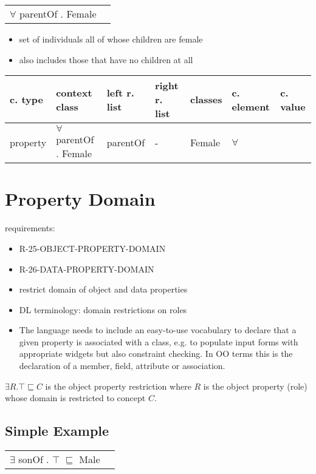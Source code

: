 \documentclass{llncs}
\newenvironment{gcotable}{
  \scriptsize
  \sffamily
  \vspace{0.3cm}
	\begin{center}
  \begin{tabular}{l|l|l|l|l|l|l}
  \hline
  \textbf{c. type} & \textbf{context class} & \textbf{left r. list} & \textbf{right r. list} & \textbf{classes} & \textbf{c. element} & \textbf{c. value} \\
  \hline

}{
  \hline
  \end{tabular}
	\end{center}
}
\newenvironment{DL}{
	\begin{center}
  \begin{tabular}{r l}

}{
  \end{tabular}
	\end{center}
}
\begin{document}
\begin{DL}
$\forall$ parentOf . Female
\end{DL}

\begin{itemize}
	\item set of individuals all of whose children are female
  \item also includes those that have no children at all
\end{itemize}

\begin{gcotable}
property & $\forall$ parentOf . Female & parentOf & - & Female & $\forall$ \\
\end{gcotable}

\section{Property Domain}

requirements:

\begin{itemize}
	\item R-25-OBJECT-PROPERTY-DOMAIN
	\item R-26-DATA-PROPERTY-DOMAIN
\end{itemize}



\begin{itemize}
	\item restrict domain of object and data properties
	\item DL terminology: domain restrictions on roles
	\item The language needs to include an easy-to-use vocabulary to declare that a given property is associated with a class, e.g. to populate input forms with appropriate widgets but also constraint checking. In OO terms this is the declaration of a member, field, attribute or association. 
\end{itemize}

$\exists R. \top \sqsubseteq C$ is the object property restriction where $R$ is the object property (role) whose domain is restricted to concept $C$.

\subsection{Simple Example}

\begin{DL}
$\exists$ sonOf . $\top$ $\sqsubseteq$ Male 
\end{DL}
\end{document}
